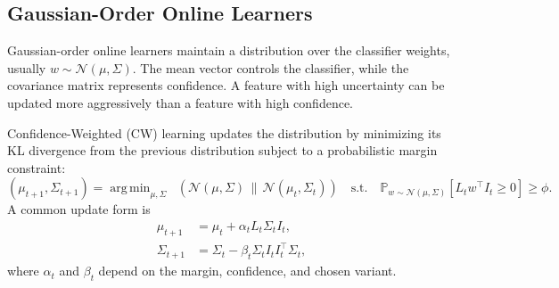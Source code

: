 ﻿\documentclass[12pt,a4paper]{article}
\DeclareMathOperator*{\argmin}{arg\,min}
\DeclareMathOperator{\KL}{D_{KL}}
\newcommand{\Prob}{\mathbb{P}}
\begin{document}
\subsection{Gaussian-Order Online Learners}
Gaussian-order online learners maintain a distribution over the classifier
weights, usually $w\sim\mathcal{N}(\mu,\Sigma)$. The mean vector controls the
classifier, while the covariance matrix represents confidence. A feature
with high uncertainty can be updated more aggressively than a feature with
high confidence.

Confidence-Weighted (CW) learning updates the distribution by minimizing its
KL divergence from the previous distribution subject to a probabilistic
margin constraint:
\begin{equation}
(\mu_{t+1},\Sigma_{t+1})=
\argmin_{\mu,\Sigma}\KL\!\left(\mathcal{N}(\mu,\Sigma)\,\|\,\mathcal{N}(\mu_t,\Sigma_t)\right)
\quad\text{s.t.}\quad
\Prob_{w\sim\mathcal{N}(\mu,\Sigma)}[L_t w^\top I_t\geq0]\geq\phi.
\label{eq:cw_problem}
\end{equation}
A common update form is
\begin{align}
\mu_{t+1} &= \mu_t+\alpha_t L_t\Sigma_t I_t,\label{eq:cw_mu}\\
\Sigma_{t+1} &= \Sigma_t-\beta_t\Sigma_t I_t I_t^\top\Sigma_t,\label{eq:cw_sigma}
\end{align}
where $\alpha_t$ and $\beta_t$ depend on the margin, confidence, and chosen
variant.

\begin{table}[H]
\centering
\caption{Gaussian-order online learning components.}
\label{tab:gaussian_order}
\renewcommand{\arraystretch}{1.35}
\end{table}
\end{document}
